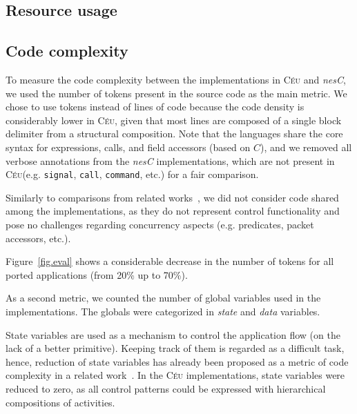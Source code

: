 \documentclass[10pt]{sensys-proc}
\newcommand{\CEU}{\textsc{C\'{e}u}\xspace}
\newcommand{\code}[1] {{\small{\texttt{#1}}}}
\begin{document}
\subsection{Resource usage}
\label{sec.eval.resource}



\subsection{Code complexity}
\label{sec.eval.code}

To measure the code complexity between the implementations in \CEU and 
\emph{nesC}, we used the number of tokens present in the source code as the 
main metric.
We chose to use tokens instead of lines of code because the code density is 
considerably lower in \CEU, given that most lines are composed of a single 
block delimiter from a structural composition.
Note that the languages share the core syntax for expressions, calls, and field 
accessors (based on $C$), and we removed all verbose annotations from the 
\emph{nesC} implementations, which are not present in \CEU (e.g. \code{signal}, 
\code{call}, \code{command}, etc.) for a fair comparison.

Similarly to comparisons from related works~\cite{wsn.ocram,wsn.protothreads}, 
we did not consider code shared among the implementations, as they do not 
represent control functionality and pose no challenges regarding concurrency 
aspects (e.g. predicates, packet accessors, etc.).

Figure~\ref{fig.eval} shows a considerable decrease in the number of tokens for 
all ported applications (from 20\% up to 70\%).

As a second metric, we counted the number of global variables used in the 
implementations.
The globals were categorized in \emph{state} and \emph{data} variables.

State variables are used as a mechanism to control the application flow (on the 
lack of a better primitive).
Keeping track of them is regarded as a difficult task, hence, reduction of 
state variables has already been proposed as a metric of code complexity in a 
related work~\cite{wsn.protothreads}.
In the \CEU implementations, state variables were reduced to zero, as all 
control patterns could be expressed with hierarchical compositions of 
activities.
\end{document}
